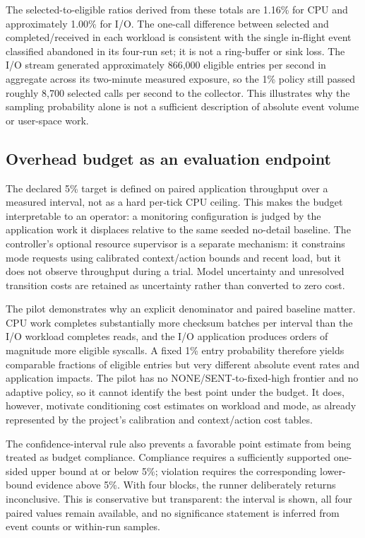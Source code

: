 \documentclass[conference]{IEEEtran}
\begin{document}
The selected-to-eligible ratios derived from these totals are 1.16\% for CPU and approximately 1.00\% for I/O. The one-call difference between selected and completed/received in each workload is consistent with the single in-flight event classified abandoned in its four-run set; it is not a ring-buffer or sink loss. The I/O stream generated approximately 866,000 eligible entries per second in aggregate across its two-minute measured exposure, so the 1\% policy still passed roughly 8,700 selected calls per second to the collector. This illustrates why the sampling probability alone is not a sufficient description of absolute event volume or user-space work.

\subsection{Overhead budget as an evaluation endpoint}
The declared 5\% target is defined on paired application throughput over a measured interval, not as a hard per-tick CPU ceiling. This makes the budget interpretable to an operator: a monitoring configuration is judged by the application work it displaces relative to the same seeded no-detail baseline. The controller's optional resource supervisor is a separate mechanism: it constrains mode requests using calibrated context/action bounds and recent load, but it does not observe throughput during a trial. Model uncertainty and unresolved transition costs are retained as uncertainty rather than converted to zero cost.

The pilot demonstrates why an explicit denominator and paired baseline matter. CPU work completes substantially more checksum batches per interval than the I/O workload completes reads, and the I/O application produces orders of magnitude more eligible syscalls. A fixed 1\% entry probability therefore yields comparable fractions of eligible entries but very different absolute event rates and application impacts. The pilot has no NONE/SENT-to-fixed-high frontier and no adaptive policy, so it cannot identify the best point under the budget. It does, however, motivate conditioning cost estimates on workload and mode, as already represented by the project's calibration and context/action cost tables.

The confidence-interval rule also prevents a favorable point estimate from being treated as budget compliance. Compliance requires a sufficiently supported one-sided upper bound at or below 5\%; violation requires the corresponding lower-bound evidence above 5\%. With four blocks, the runner deliberately returns inconclusive. This is conservative but transparent: the interval is shown, all four paired values remain available, and no significance statement is inferred from event counts or within-run samples.
\end{document}
